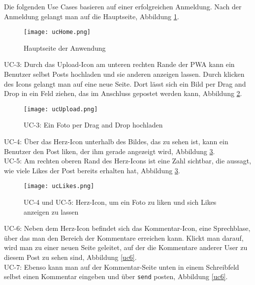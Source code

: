 Die folgenden Use Cases basieren auf einer erfolgreichen Anmeldung. Nach der Anmeldung gelangt man auf die Hauptseite, Abbildung \ref{uchome}.

\begin{figure}[!htb]
    \centering
    \texttt{[image: ucHome.png]}
    \caption{Hauptseite der Anwendung}
    \label{uchome}
\end{figure}

\newpage

UC-3: 
Durch das Upload-Icon am unteren rechten Rande der PWA kann ein Benutzer selbst Posts hochladen und sie anderen anzeigen lassen. Durch klicken des Icons gelangt man auf eine neue Seite. Dort lässt sich ein Bild per Drag and Drop in ein Feld ziehen, das im Anschluss gepostet werden kann, Abbildung \ref{uc3}. \\


\begin{figure}[!htb]
    \centering
    \texttt{[image: ucUpload.png]}
    \caption{UC-3: Ein Foto per Drag and Drop hochladen}
    \label{uc3}
\end{figure}

\newpage

UC-4:
Über das Herz-Icon unterhalb des Bildes, das zu sehen ist, kann ein Benutzer den Post liken, der ihm gerade angezeigt wird, Abbildung \ref{uc4}.\\


UC-5:
Am rechten oberen Rand des Herz-Icons ist eine Zahl sichtbar, die aussagt, wie viele Likes der Post bereits erhalten hat, Abbildung \ref{uc4}.\\

\begin{figure}[!htb]
    \centering
    \texttt{[image: ucLikes.png]}
    \caption{UC-4 und UC-5: Herz-Icon, um ein Foto zu liken und sich Likes anzeigen zu lassen}
    \label{uc4}
\end{figure}



UC-6:
Neben dem Herz-Icon befindet sich das Kommentar-Icon, eine Sprechblase, über das man den Bereich der Kommentare erreichen kann. Klickt man darauf, wird man zu einer neuen Seite geleitet, auf der die Kommentare anderer User zu diesem Post zu sehen sind, Abbildung \ref{uc6}. \\

    
UC-7:
Ebenso kann man auf der Kommentar-Seite unten in einem Schreibfeld selbst einen Kommentar eingeben und über \texttt{send} posten, Abbildung \ref{uc6}.

